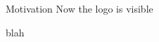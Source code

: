 \documentclass[13pt]{beamer}
\date{\today}
\begin{document}
\begin{frame}
\maketitle
\end{frame}

\begin{frame}[label=takeaway,standout]{Motivation}
Now the logo is visible
\end{frame}

\begin{frame}
blah
\end{frame}


\end{document}
